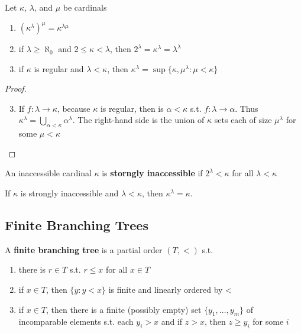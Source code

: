 \documentclass[11pt]{article}
\begin{document}
\begin{lemma}[]
Let \(\kappa\), \(\lambda\), and \(\mu\) be cardinals
\begin{enumerate}
\item \((\kappa^\lambda)^\mu=\kappa^{\lambda\mu}\)
\item if \(\lambda\ge\aleph_0\) and \(2\le\kappa<\lambda\), then \(2^\lambda=\kappa^\lambda=\lambda^\lambda\)
\item if \(\kappa\) is regular and \(\lambda<\kappa\), then \(\kappa^\lambda=\sup\{\kappa,\mu^\lambda:\mu<\kappa\}\)
\end{enumerate}
\end{lemma}

\begin{proof}
\begin{enumerate}
\setcounter{enumi}{2}
\item If \(f:\lambda\to\kappa\), because \(\kappa\) is regular, then is \(\alpha<\kappa\) s.t. \(f:\lambda\to\alpha\). Thus
\(\kappa^\lambda=\bigcup_{\alpha<\kappa}\alpha^\lambda\). The right-hand side is the union of \(\kappa\) sets each of size \(\mu^\lambda\) for some \(\mu<\kappa\)
\end{enumerate}
\end{proof}

An inaccessible cardinal \(\kappa\) is \textbf{storngly inaccessible} if \(2^\lambda<\kappa\) for all \(\lambda<\kappa\)

\begin{corollary}[]
If \(\kappa\) is strongly inaccessible and \(\lambda<\kappa\), then \(\kappa^\lambda=\kappa\).
\end{corollary}
\subsection{Finite Branching Trees}
\label{sec:orga518a02}
\begin{definition}[]
A \textbf{finite branching tree} is a partial order \((T,<)\) s.t.
\begin{enumerate}
\item there is \(r\in T\) s.t. \(r\le x\) for all \(x\in T\)
\item if \(x\in T\), then \(\{y:y<x\}\) is finite and linearly ordered by <
\item if \(x\in T\), then there is a finite (possibly empty) set \(\{y_1,\dots,y_m\}\) of incomparable
elements s.t. each \(y_i>x\) and if \(z>x\), then \(z\ge y_i\) for some \(i\)
\end{enumerate}
\end{definition}
\end{document}
